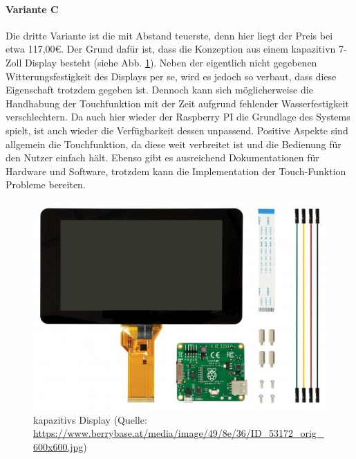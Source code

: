 \paragraph{Variante C}
Die dritte Variante ist die mit Abstand teuerste, denn hier liegt der Preis bei etwa 117,00€. Der Grund dafür ist, dass die Konzeption aus einem \gls{kapazitiv}n 7-Zoll Display besteht (siehe Abb. \ref{fig:kapazitives_display}). Neben der eigentlich nicht gegebenen Witterungsfestigkeit des Displays per se, wird es jedoch so verbaut, dass diese Eigenschaft trotzdem gegeben ist. Dennoch kann sich möglicherweise die Handhabung der Touchfunktion mit der Zeit aufgrund fehlender Wasserfestigkeit verschlechtern. Da auch hier wieder der Raspberry PI die Grundlage des Systems spielt, ist auch wieder die Verfügbarkeit dessen unpassend. Positive Aspekte sind allgemein die Touchfunktion, da diese weit verbreitet ist und die Bedienung für den Nutzer einfach hält. Ebenso gibt es ausreichend Dokumentationen für Hardware und Software, trotzdem kann die Implementation der Touch-Funktion Probleme bereiten.
\begin{figure}[ht]
	\centering
	\includegraphics[width=0.6\linewidth]{Bilder/kapazitives_display.jpg}
	\caption{\gls{kapazitiv}s Display (Quelle: \url{https://www.berrybase.at/media/image/49/8e/36/ID_53172_orig_600x600.jpg})}
	\label{fig:kapazitives_display}
\end{figure}
\newpage
